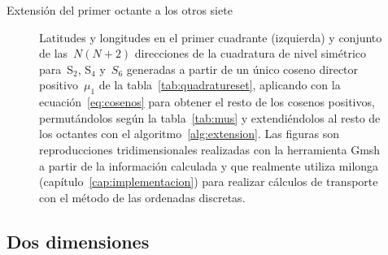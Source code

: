 \begin{algorithm}
\DontPrintSemicolon
{}
\caption{\label{alg:extension}Extensión del primer octante a los otros siete}
\end{algorithm}

\begin{figure}[p]
\begin{center}


\end{center}

\caption{\label{fig:latsn}Latitudes y longitudes en el primer cuadrante (izquierda) y conjunto de las~$N(N+2)$ direcciones de la cuadratura de nivel simétrico para~S$_2$, S$_4$ y~$S_6$ generadas a partir de un único coseno director positivo~$\mu_1$ de la tabla~\ref{tab:quadratureset}, aplicando con la ecuación~\eqref{eq:cosenos} para obtener el resto de los cosenos positivos, permutándolos según la tabla~\ref{tab:mus} y extendiéndolos al resto de los octantes con el algoritmo~\ref{alg:extension}. Las figuras son reproducciones tridimensionales realizadas con la herramienta Gmsh a partir de la información calculada y que realmente utiliza milonga (capítulo~\ref{cap:implementacion}) para realizar cálculos de transporte con el método de las ordenadas discretas.}
\end{figure}


\subsection{Dos dimensiones} %
\label{sec:dosdimensiones}

